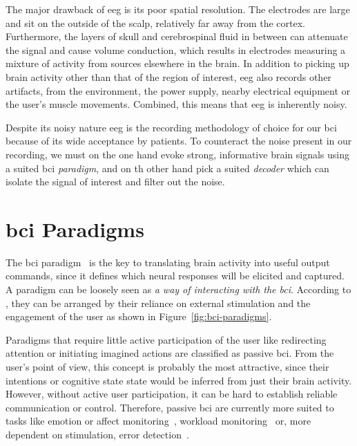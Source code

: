 The major drawback of \ac{eeg} is its poor spatial resolution.
The electrodes are large and sit on the outside of the scalp, relatively far
away from the cortex.
Furthermore, the layers of skull and cerebrospinal fluid in between can
attenuate the signal and cause volume conduction, which results in electrodes
measuring a mixture of activity from sources elsewhere in the brain.
In addition to picking up brain activity other than that of the region of
interest, \ac{eeg} also records other artifacts, from the
environment, the power supply, nearby electrical equipment or the user's muscle
movements.
Combined, this means that \ac{eeg} is inherently noisy.

Despite its noisy nature \Ac{eeg} is the recording methodology of choice for
our \ac{bci} because of its wide acceptance by patients.
To counteract the noise present in our recording, we must on the one hand evoke
strong, informative brain signals using a suited \ac{bci} \emph{paradigm}, and on th
other hand pick a suited \emph{decoder} which can isolate the signal of
interest and filter out the noise.

\section{\ac{bci} Paradigms}
\label{sec:bci-paradigms}

The \ac{bci} paradigm~\cite{Xu2021} is the key to translating brain activity into useful
output commands, since it defines which neural responses will be elicited and
captured.
A paradigm can be loosely seen as \emph{a way of interacting with the
\ac{bci}}.
According to \textcite{Zander2011}, they can be arranged by their reliance on
external stimulation and the engagement of the user as shown in
Figure~\ref{fig:bci-paradigms}.


Paradigms that require little active participation of the user like
redirecting attention or initiating imagined actions are classified as passive
\ac{bci}.
From the user's point of view, this concept is probably the most attractive,
since their intentions or cognitive state state would be inferred from just
their brain activity.
However, without active user participation, it can be hard to establish reliable
communication or control.
Therefore, passive \ac{bci} are currently more suited to tasks like
emotion or affect monitoring~\cite{Torres2020,Libert2019}, workload
monitoring~\cite{Zanetti2021} or, more dependent on stimulation, error
detection~\cite{SiMohammed2020}.

